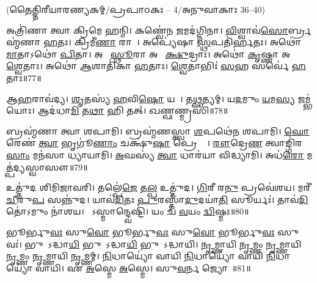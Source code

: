 \vspace{-1ex}
\centerline{\normalsize (𑌤𑍈𑌤𑍍𑌤𑌿𑌰𑍀𑌯𑌾𑌰𑌣𑍍𑌯𑌕𑌮𑍍/𑌪𑍍𑌰𑌪𑌾𑌠𑌕𑌃 – 4/𑌅𑌨𑍁𑌵𑌾𑌕𑌾𑌃 36--40)}

𑌅𑌤𑍍𑌰𑌿॑𑌣𑌾 𑌤𑍍𑌵𑌾 𑌕𑍍𑌰𑌿𑌮𑍇 𑌹𑌨𑍍𑌮𑌿। 
𑌕𑌣𑍍𑌵𑍇॑𑌨 \ul{𑌜}𑌮𑌦॑𑌗𑍍𑌨𑌿𑌨𑌾। 
\ul{𑌵𑌿}𑌶𑍍𑌵𑌾𑌵॑\ul{𑌸𑍋}𑌰𑍍𑌬𑍍𑌰𑌹𑍍𑌮॑𑌣𑌾 \ul{𑌹}𑌤𑌃। 
𑌕𑍍𑌰𑌿𑌮𑍀॑\ul{𑌣𑌾}\ul{} 𑌰𑌾𑌜𑌾᳚। 
𑌅𑌪𑍍𑌯𑍇॑𑌷𑌾 \ul{𑌸𑍍𑌥}𑌪𑌤𑌿॑𑌰𑍍\mbox{}\ul{𑌹}𑌤𑌃। 
𑌅𑌥𑍋॑ \ul{𑌮𑌾}𑌤𑌾𑌽𑌥𑍋॑ \ul{𑌪𑌿}𑌤𑌾। 
𑌅𑌥𑍋᳚ \ul{𑌸𑍍𑌥𑍂}𑌰𑌾 𑌅𑌥𑍋᳚ \ul{𑌕𑍍𑌷𑍁}𑌦𑍍𑌰𑌾𑌃। 
𑌅𑌥𑍋॑ \ul{𑌕𑍃}𑌷𑍍𑌣𑌾 𑌅𑌥𑍋᳚ \ul{𑌶𑍍𑌵𑍇}𑌤𑌾𑌃। 
𑌅𑌥𑍋॑ \ul{𑌆}𑌶𑌾𑌤𑌿॑𑌕𑌾 \ul{𑌹}𑌤𑌾𑌃। 
\ul{𑌶𑍍𑌵𑍇}𑌤𑌾𑌭𑌿𑌃॑ \ul{𑌸}𑌹 𑌸𑌰𑍍𑌵𑍇॑ \ul{𑌹}𑌤𑌾𑌃॥77॥



𑌆\ul{𑌹}𑌰𑌾𑌵॑𑌦𑍍𑌯। 
\ul{𑌶𑍃}𑌤𑌸𑍍𑌯॑ \ul{𑌹}𑌵𑌿\ul{𑌷𑍋} 𑌯𑌥𑌾᳚। 
𑌤\ul{𑌥𑍍𑌸}𑌤𑍍𑌯𑌮𑍍। 
𑌯\ul{𑌦}𑌮𑍁𑌂 \ul{𑌯}𑌮\ul{𑌸𑍍𑌯} 𑌜𑌮𑍍𑌭॑𑌯𑍋𑌃। 
𑌆𑌦॑𑌧𑌾\ul{𑌮𑌿} 𑌤\ul{𑌥𑌾} 𑌹𑌿 𑌤𑌤𑍍। 
𑌖𑌣𑍍𑌫𑌣𑍍𑌮𑍍𑌰𑌸𑌿॑॥78॥



𑌬𑍍𑌰𑌹𑍍𑌮॑𑌣𑌾 𑌤𑍍𑌵𑌾 𑌶𑌪𑌾𑌮𑌿। 
𑌬𑍍𑌰𑌹𑍍𑌮॑𑌣𑌸𑍍𑌤𑍍𑌵𑌾 \ul{𑌶}𑌪𑌥𑍇॑𑌨 𑌶𑌪𑌾𑌮𑌿। 
\ul{𑌘𑍋}𑌰𑍇𑌣॑ \ul{𑌤𑍍𑌵𑌾} 𑌭𑍃𑌗𑍂॑\ul{𑌣𑌾𑌂} 𑌚𑌕𑍍𑌷𑍁॑\ul{𑌷𑌾} 𑌪𑍍𑌰𑍇𑌕𑍍𑌷𑍇᳚। 
\ul{𑌰𑍗}𑌦𑍍𑌰𑍇\ul{𑌣} 𑌤𑍍𑌵𑌾𑌙𑍍𑌗𑌿॑𑌰\ul{𑌸𑌾𑌂} 𑌮𑌨॑𑌸𑌾 𑌧𑍍𑌯𑌾𑌯𑌾𑌮𑌿। 
\ul{𑌅}𑌘𑌸𑍍𑌯॑ \ul{𑌤𑍍𑌵𑌾} 𑌧𑌾𑌰॑𑌯𑌾 𑌵𑌿𑌦𑍍𑌧𑍍𑌯𑌾𑌮𑌿। 
𑌅𑌧॑\ul{𑌰𑍋} 𑌮𑌤𑍍𑌪॑𑌦𑍍𑌯𑌸𑍍𑌵𑌾𑌸𑍗॥79॥%



𑌉𑌤𑍍𑌤𑍁॑𑌦 𑌶𑌿𑌮𑌿𑌜𑌾𑌵𑌰𑌿। 
𑌤𑌲𑍍𑌪𑍇॑\ul{𑌜𑍇} 𑌤\ul{𑌲𑍍𑌪} 𑌉𑌤𑍍𑌤𑍁॑𑌦। 
\ul{𑌗𑌿}𑌰𑍀 𑌰\ul{𑌨𑍁} 𑌪𑍍𑌰𑌵𑍇॑𑌶𑌯। 
𑌮𑌰𑍀॑\ul{𑌚𑍀}𑌰𑍁\ul{𑌪} 𑌸𑌨𑍍𑌨𑍁॑𑌦। 
𑌯𑌾𑌵॑\ul{𑌦𑌿}𑌤𑌃 \ul{𑌪𑍁}𑌰𑌸𑍍𑌤𑌾॑\ul{𑌦𑍁}𑌦𑌯𑌾॑\ul{𑌤𑌿} 𑌸𑍂𑌰𑍍𑌯𑌃॑। 
𑌤𑌾𑌵॑\ul{𑌦𑌿}𑌤𑍋॑𑌽𑌮𑍁𑌂 𑌨𑌾॑𑌶𑌯। 
𑌯𑍋᳚𑌽𑌸𑍍𑌮𑌾𑌨𑍍𑌦𑍍𑌵𑍇𑌷𑍍𑌟𑌿॑। 
𑌯𑌂 𑌚॑ \ul{𑌵}𑌯𑌂 \ul{𑌦𑍍𑌵𑌿}𑌷𑍍𑌮𑌃॥80॥



𑌭𑍂𑌰𑍍𑌭𑍁\ul{𑌵𑌃} 𑌸𑍁\ul{𑌵𑍋} 𑌭𑍂𑌰𑍍𑌭𑍁\ul{𑌵𑌃} 𑌸𑍁\ul{𑌵𑍋} 𑌭𑍂𑌰𑍍𑌭𑍁\ul{𑌵𑌃} 𑌸𑍁𑌵𑌃॑। 
𑌭𑍁𑌵𑍋᳚𑌽𑌦𑍍𑌧𑌾\ul{𑌯𑌿} 𑌭𑍁𑌵𑍋᳚𑌽𑌦𑍍𑌧𑌾\ul{𑌯𑌿} 𑌭𑍁𑌵𑍋᳚𑌽𑌦𑍍𑌧𑌾𑌯𑌿। 
\ul{𑌨𑍃}𑌮𑍍𑌣𑌾𑌯𑌿 \ul{𑌨𑍃}𑌮𑍍𑌣𑌂 \ul{𑌨𑍃}𑌮𑍍𑌣𑌾𑌯𑌿 \ul{𑌨𑍃}𑌮𑍍𑌣𑌂 \ul{𑌨𑍃}𑌮𑍍𑌣𑌾𑌯𑌿 \ul{𑌨𑍃}𑌮𑍍𑌣𑌮𑍍। 
\ul{𑌨𑌿}𑌧𑌾𑌯𑍍𑌯𑍋॑ 𑌵𑌾𑌯𑌿 \ul{𑌨𑌿}𑌧𑌾𑌯𑍍𑌯𑍋॑ 𑌵𑌾𑌯𑌿 \ul{𑌨𑌿}𑌧𑌾𑌯𑍍𑌯𑍋॑ 𑌵𑌾𑌯𑌿। 
𑌏 \ul{𑌅}𑌸𑍍𑌮𑍇 \ul{𑌅}𑌸𑍍𑌮𑍇। 
𑌸𑍁\ul{𑌵}𑌰𑍍𑌨 𑌜𑍍𑌯𑍋𑌤𑍀𑌃᳚॥81॥

\closesection

